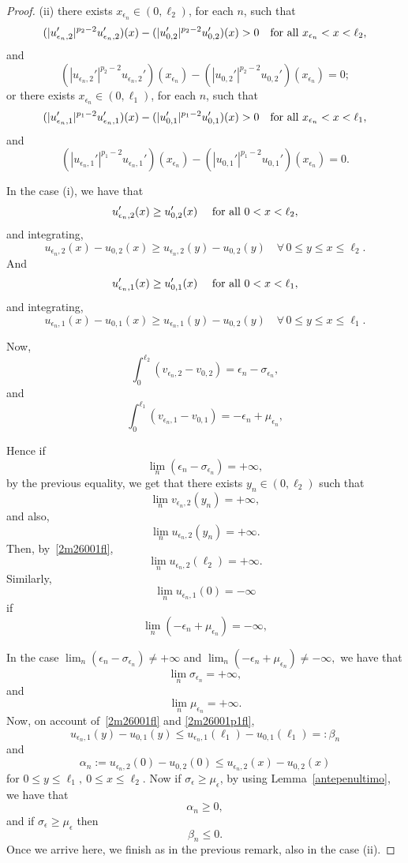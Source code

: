 \documentclass[reqno,12pt]{amsart}
\numberwithin{equation}{section} %
\begin{document}
\begin{proof}
\noindent (ii) there exists $x_{\epsilon_n}\in (0,\ell_2)$, for each $n$, such that $$(|u_{\epsilon_n,2}'|^{p_{2}-2}u_{\epsilon_n,2}')(x)
 -(|u_{0,2}'|^{p_{2}-2}u_{0,2}')(x)>0\quad\hbox{for all }x_{\epsilon_n}<x<\ell_2,$$
 and 
 $$(|u_{\epsilon_n,2}'|^{p_{2}-2}u_{\epsilon_n,2}')(x_{\epsilon_n})
 -(|u_{0,2}'|^{p_{2}-2}u_{0,2}')(x_{\epsilon_n})=0;$$
 or there exists $x_{\epsilon_n}\in (0,\ell_1)$, for each $n$, such that $$(|u_{\epsilon_n,1}'|^{p_{1}-2}u_{\epsilon_n,1}')(x)
 -(|u_{0,1}'|^{p_{1}-2}u_{0,1}')(x)>0\quad\hbox{for all }x_{\epsilon_n}<x<\ell_1,$$
 and 
 $$(|u_{\epsilon_n,1}'|^{p_{1}-2}u_{\epsilon_n,1}')(x_{\epsilon_n})
 -(|u_{0,1}'|^{p_{1}-2}u_{0,1}')(x_{\epsilon_n})=0.$$

In the case (i), we have that $$u_{\epsilon_n,2}'(x)\ge u_{0,2}'(x) \quad\hbox{ for all } 0<x<\ell_2,$$
and integrating,
\begin{equation}\label{2m26001fl}
u_{\epsilon_n,2}(x)-u_{0,2}(x)\ge u_{\epsilon_n,2}(y)-u_{0,2}(y)\quad\forall\, 0\le y\le x\le\ell_2.
\end{equation}
And $$u_{\epsilon_n,1}'(x)\ge u_{0,1}'(x) \quad\hbox{ for all } 0<x<\ell_1,$$
and integrating,
\begin{equation}\label{2m26001p1fl}
u_{\epsilon_n,1}(x)- u_{0,1}(x)\ge u_{\epsilon_n,1}(y)-u_{0,2}(y)\quad\forall\, 0\le y\le x\le\ell_1.
\end{equation}

Now,
$$\int_0^{\ell_2}(v_{\epsilon_n,2}-v_{0,2})=\epsilon_n-\sigma_{\epsilon_n},$$
and  
$$\int_0^{\ell_1}(v_{\epsilon_n,1}-v_{0,1})=-\epsilon_n+\mu_{\epsilon_n},$$



Hence if $$\lim_n(\epsilon_n-\sigma_{\epsilon_n})=+\infty,$$ by the previous equality, we get that there exists $ y_{n}\in (0,\ell_2)$ such that
$$\lim_n v_{\epsilon_n,2}(y_n)=+\infty,$$
and also,
$$\lim_n u_{\epsilon_n,2}(y_n)=+\infty.$$
Then, by~\eqref{2m26001fl},
$$\lim_n u_{\epsilon_n,2}(\ell_2)=+\infty.$$
Similarly, 
$$\lim_n u_{\epsilon_n,1}(0)=-\infty$$
if 
$$\lim_n(-\epsilon_n+\mu_{\epsilon_n})=-\infty,$$

In the case 
$\lim_n(\epsilon_n-\sigma_{\epsilon_n})\not=+\infty $
and $\lim_n(-\epsilon_n+\mu_{\epsilon_n})\not=-\infty,$
we have that $$\lim_n\sigma_{\epsilon_n}=+\infty,$$
and
$$\lim_n\mu_{\epsilon_n}=+\infty.$$
Now,   on account of~\eqref{2m26001fl} and \eqref{2m26001p1fl},
$$u_{\epsilon_n,1}(y)-u_{0,1}(y)\le u_{\epsilon_n,1}(\ell_1)-u_{0,1}(\ell_1)=:\beta_n$$  and $$\alpha_n:=u_{\epsilon_n,2}(0)-u_{0,2}(0)\le u_{\epsilon_n,2}(x)-u_{0,2}(x)$$  for $0\le y\le\ell_1,\ 0\le x\le \ell_2$.
Now if $\sigma_\epsilon\ge \mu_\epsilon$,  by using Lemma~\ref{antepenultimo}, 
we have that $$\alpha_n \ge 0,$$
and if  $\sigma_\epsilon\ge \mu_\epsilon$
then
$$\beta_n \le 0.$$
Once we   arrive here, we finish as in the previous remark, also in the case  (ii). 
\end{proof}
\end{document}
